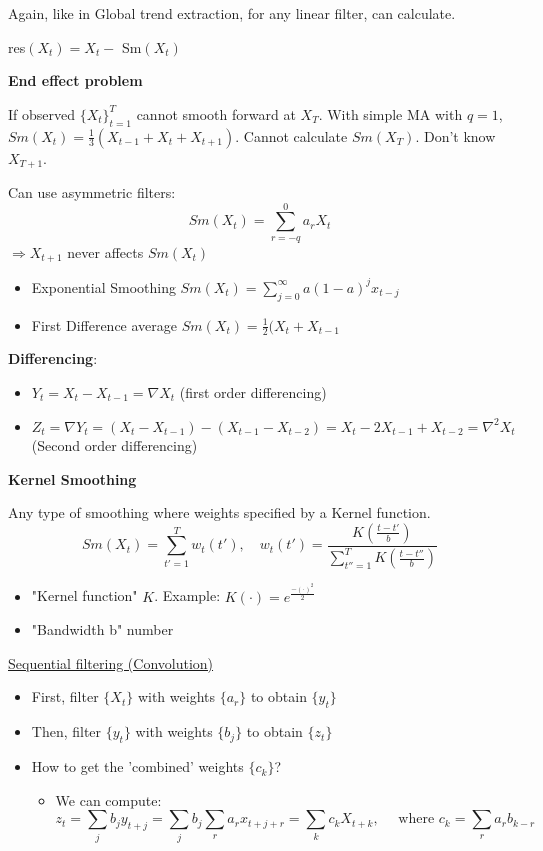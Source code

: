 Again, like in Global trend extraction, for any linear filter, can calculate.
\begin{mdframed}
\centering
res$(X_t)=X_t-$ Sm$(X_t)$
\end{mdframed}

\bigskip

\textbf{End effect problem}

\bigskip
If observed $ \{X_t\}_{t=1}^T $ cannot smooth forward at $X_T$. With simple MA with $q=1$, $Sm(X_t)=\frac{1}{3}(X_{t-1}+X_t+X_{t+1})$. Cannot calculate $Sm(X_T)$. Don't know $X_{T+1}$.

Can use asymmetric filters:
$$Sm(X_t)=\sum_{r=-q}^0 a_r X_t$$
$\Rightarrow X_{t+1}$ never affects $Sm(X_t)$
\begin{itemize}
    \item Exponential Smoothing $Sm(X_t)=\sum_{j=0}^\infty a(1-a)^j x_{t-j}$
    \item First Difference average $Sm(X_t)=\frac{1}{2}(X_t+X_{t-1}$
\end{itemize}


\textbf{Differencing}:
\begin{itemize}
    \item $Y_t =X_t-X_{t-1} = \nabla X_t$ (first order differencing)
    \item $Z_t=\nabla Y_t= (X_t-X_{t-1})-(X_{t-1}-X_{t-2})=X_t-2X_{t-1}+X_{t-2}=\nabla^2X_t$ (Second order differencing)
\end{itemize}

\textbf{Kernel Smoothing}

\bigskip

Any type of smoothing where weights specified by a Kernel function. 
$$Sm(X_t)=\sum_{t'=1}^T w_t(t'), \quad w_t(t')= \frac{K\left(\frac{t-t'}{b} \right)}{\sum_{t''=1}^T K\left( \frac{t-t''}{b}\right)}$$

\begin{itemize}
    \item "Kernel function" $K$. \quad Example: $K(\cdot)=e^{\frac{-(\cdot)^2}{2}}$
    \item "Bandwidth b" number 
\end{itemize}

\bigskip

\underline{Sequential filtering (Convolution)}

\bigskip

\begin{itemize}
    \item First, filter $\{X_t\}$ with weights $\{a_r\}$ to obtain $\{y_t\}$
    \item Then, filter $\{y_t\}$ with weights $\{b_j\}$ to obtain $\{z_t\}$
    \item How to get the 'combined' weights $\{c_k\}$?
        \begin{itemize}
            \item We can compute:
            \[
            z_t=\sum_j b_j y_{t+j}=\sum_jb_j \sum_r a_r x_{t+j+r} = \sum_k c_k X_{t+k}, \quad \text{ where } c_k=\sum_r a_r b_{k-r}
            \]
        \end{itemize}
\end{itemize}

